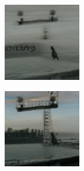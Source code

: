 \documentclass{article}
\begin{document}
\begin{figure}
    \begin{subfigure}[b]{0.5\linewidth}
        \begin{subfigure}[b]{0.242\linewidth}
        \includegraphics[width=\linewidth]{figures/imagenet128/solver_samples/imagenet128_fm_ot_50_05.png}
        \end{subfigure}%
        \begin{subfigure}[b]{0.242\linewidth}
        \includegraphics[width=\linewidth]{figures/imagenet128/solver_samples/imagenet128_fm_ot_50_10.png}

\end{subfigure}
\end{subfigure}
\end{figure}
\end{document}

